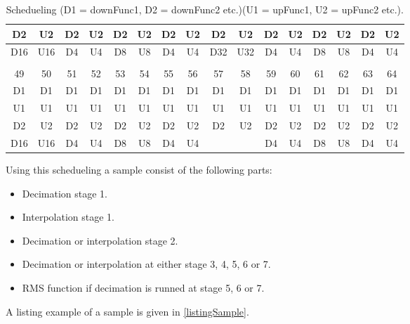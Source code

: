 \begin{table}[H]
\begin{tabular}{|c|c|c|c|c|c|c|c|c|c|c|c|c|c|c|c|}
D2  & U2  & D2 & U2 & D2 & U2 & D2 & U2 & D2  & U2  & D2 & U2 & D2 & U2 & D2 & U2 \\ \hline
D16 & U16 & D4 & U4 & D8 & U8 & D4 & U4 & D32 & U32 & D4 & U4 & D8 & U8 & D4 & U4 \\ \hline
\rowcolor[HTML]{C0C0C0} 
\multicolumn{16}{|c|}{\cellcolor[HTML]{C0C0C0}Sample}                             \\ \hline
\rowcolor[HTML]{C0C0C0} 
49  & 50  & 51 & 52 & 53 & 54 & 55 & 56 & 57  & 58  & 59 & 60 & 61 & 62 & 63 & 64 \\ \hline
D1  & D1  & D1 & D1 & D1 & D1 & D1 & D1 & D1  & D1  & D1 & D1 & D1 & D1 & D1 & D1 \\ \hline
U1  & U1  & U1 & U1 & U1 & U1 & U1 & U1 & U1  & U1  & U1 & U1 & U1 & U1 & U1 & U1 \\ \hline
D2  & U2  & D2 & U2 & D2 & U2 & D2 & U2 & D2  & U2  & D2 & U2 & D2 & U2 & D2 & U2 \\ \hline
D16 & U16 & D4 & U4 & D8 & U8 & D4 & U4 &     &     & D4 & U4 & D8 & U8 & D4 & U4 \\ \hline
\end{tabular}
\caption{Schedueling (D1 = downFunc1, D2 = downFunc2 etc.)(U1 = upFunc1, U2 = upFunc2 etc.).}
\label{tb:schedueling}
\end{table}


Using this schedueling a sample consist of the following parts:
\begin{itemize}
\item Decimation stage 1.
\item Interpolation stage 1.
\item Decimation or interpolation stage 2.
\item Decimation or interpolation at either stage 3, 4, 5, 6 or 7. 
\item RMS function if decimation is runned at stage 5, 6 or 7.
\end{itemize}

A listing example of a sample is given in \autoref{listingSample}. 

